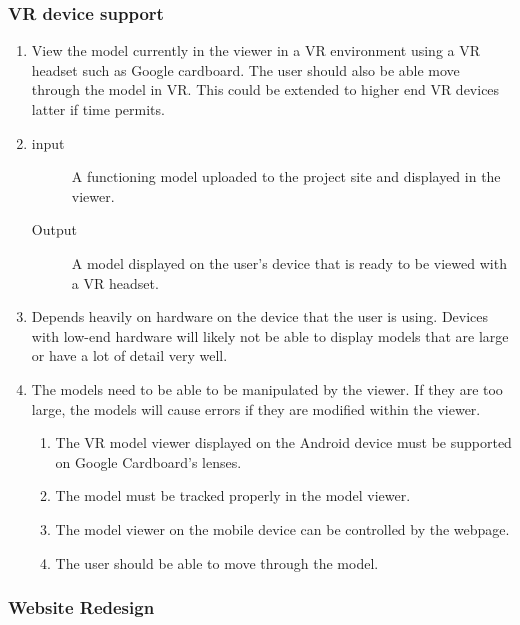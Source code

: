 \documentclass[letterpaper, 10pt, draftclsnofoot, compsoc, onecolumn]{IEEEtran}
\begin{document}
\subsubsection{VR device support}

\begin{enumerate}
	\item View the model currently in the viewer in a VR environment using a VR headset such as Google cardboard. The user should also
	be able move through the model in VR. This could be extended to higher end VR devices latter if time permits.

	\item
	\begin{description}
		\item[input] A functioning model uploaded to the project site and displayed in the viewer.
		\item[Output] A model displayed on the user's device that is ready to be viewed with a VR headset.
	\end{description}

	\item Depends heavily on hardware on the device that the user is using. Devices with low-end hardware will likely not be able to 
	display models that are large or have a lot of detail very well.  

	\item The models need to be able to be manipulated by the viewer. If they are too large, the models will cause errors if they are 
	modified within the viewer.  

	\begin{enumerate}
		\item The VR model viewer displayed on the Android device must be supported on Google Cardboard's lenses. 
		\item The model must be tracked properly in the model viewer. 
		\item The model viewer on the mobile device can be controlled by the webpage. 
		\item The user should be able to move through the model. 
	\end{enumerate} 
\end{enumerate}

\subsubsection{Website Redesign}
\end{document}
